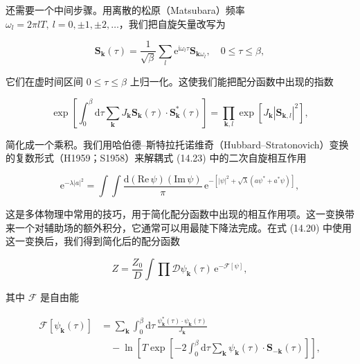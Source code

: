 还需要一个中间步骤。用离散的松原（Matsubara）频率 $\omega_l=2\pi l T,\ l=0,\pm 1,\pm 2,\ldots$，我们把自旋矢量改写为

\begin{equation*}
\mathbf{S}_{\mathbf{k}}(\tau) = \frac{1}{\sqrt{\beta}} \sum_l \mathrm{e}^{\mathrm{i}\omega_l\tau} \mathbf{S}_{\mathbf{k}\omega_l}, \quad 0\le\tau\le\beta,\tag{14.22}
\end{equation*}

它们在虚时间区间 $0\le\tau\le\beta$ 上归一化。这使我们能把配分函数中出现的指数

\begin{equation*}
\exp\left[ \int_0^{\beta} \mathrm{d}\tau \sum_{\mathbf{k}} J_{\mathbf{k}} \mathbf{S}_{\mathbf{k}}(\tau)\cdot\mathbf{S}_{\mathbf{k}}^{*}(\tau) \right] = \prod_{\mathbf{k},l} \exp\left[ J_{\mathbf{k}} |\mathbf{S}_{\mathbf{k},l}|^2 \right],\tag{14.23}
\end{equation*}

简化成一个乘积。我们用哈伯德–斯特拉托诺维奇（Hubbard--Stratonovich）变换的复数形式（H1959；S1958）来解耦式 (14.23) 中的二次自旋相互作用

\begin{equation*}
\mathrm{e}^{-\lambda|a|^2} = \int\!\!\int \frac{\mathrm{d}(\mathrm{Re}\,\psi)(\mathrm{Im}\,\psi)}{\pi}\, \mathrm{e}^{-\left[ |\psi|^2 + \sqrt{\lambda}(a\psi^*+a^*\psi) \right]},\tag{14.24}
\end{equation*}

这是多体物理中常用的技巧，用于简化配分函数中出现的相互作用项。这一变换带来一个对辅助场的额外积分，它通常可以用最陡下降法完成。在式 (14.20) 中使用这一变换后，我们得到简化后的配分函数

\begin{equation*}
Z = \frac{Z_0}{D} \int \prod \mathcal{D}\psi_{\mathbf{k}}(\tau)\, \mathrm{e}^{-\mathcal{F}[\psi]},\tag{14.25}
\end{equation*}

其中 $\mathcal{F}$ 是自由能

\begin{align*}
\mathcal{F}[\psi_{\mathbf{k}}(\tau)] &= \sum_{\mathbf{k}} \int_0^{\beta} \mathrm{d}\tau\, \frac{\psi_{\mathbf{k}}^{*}(\tau)\cdot\psi_{\mathbf{k}}(\tau)}{J_{\mathbf{k}}} \\
&\quad -\ln\left[ \left. T \exp\left[ -2\int_0^{\beta} \mathrm{d}\tau \sum_{\mathbf{k}} \psi_{\mathbf{k}}(\tau)\cdot\mathbf{S}_{-\mathbf{k}}(\tau) \right] \right. \right],\tag{14.26}
\end{align*}

